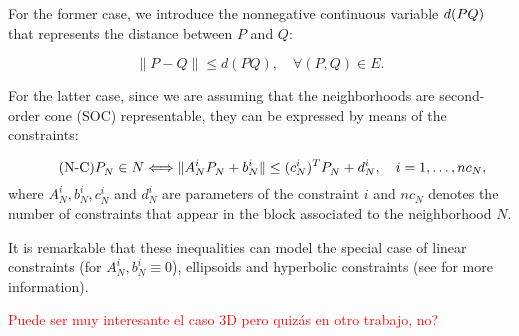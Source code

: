 \documentclass[a4paper]{elsarticle}
\begin{document}
\newcommand{\dvar}[2]{d(#1#2)}

For the former case, we introduce the nonnegative continuous variable $\dvar{PQ}$ that represents the distance between $P$ and $Q$:


\begin{equation*}\tag{d-C}\label{eq:dC}
\|P - Q\|\leq \dvar{P}{Q},\quad\forall (P,Q)\in E.
\end{equation*}

For the latter case, since we are assuming that the neighborhoods are second-order cone (SOC) representable, they can be expressed by means of the constraints:

\begin{equation*}\tag{N-C}\label{eq:nC}
 P^{}_N\in N \Longleftrightarrow
  \|A_N^i P_N^{} + b_N^i\| \leq (c_N^i)^T P_N^{} + d_N^i,\quad i=1,\ldots,nc_N, \\
\end{equation*}
where $A_N^i, b_N^i, c_N^i$ and $d_N^i$ are parameters of the constraint $i$ and $nc_N$ denotes the number of constraints that appear in the block associated to the neighborhood $N$.

It is remarkable that these inequalities can model the special case of linear constraints (for $A_N^{i}, b_N^i\equiv 0$), ellipsoids and hyperbolic constraints (see \cite{Lobo1998} for more information).

\textcolor{red}{Puede ser muy interesante el caso 3D pero quizás en otro trabajo, no?}
\end{document}
